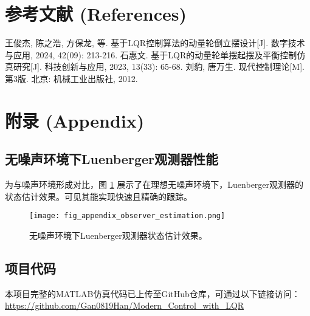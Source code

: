 \documentclass[12pt, a4paper]{article}
\begin{document}
\section{参考文献 (References)}
\begin{thebibliography}{9}
     王俊杰, 陈之浩, 方保龙, 等. 基于LQR控制算法的动量轮倒立摆设计[J]. 数字技术与应用, 2024, 42(09): 213-216.
     石惠文. 基于LQR的动量轮单摆起摆及平衡控制仿真研究[J]. 科技创新与应用, 2023, 13(33): 65-68.
     刘豹, 唐万生. 现代控制理论[M]. 第3版. 北京: 机械工业出版社, 2012.
\end{thebibliography}

\appendix
\section{附录 (Appendix)}
\subsection{无噪声环境下Luenberger观测器性能}
为与噪声环境形成对比，图 \ref{fig:appendix_observer} 展示了在理想无噪声环境下，Luenberger观测器的状态估计效果。可见其能实现快速且精确的跟踪。
\begin{figure}[htbp]
    \centering
    \texttt{[image: fig\_appendix\_observer\_estimation.png]}
    \caption{无噪声环境下Luenberger观测器状态估计效果。}
    \label{fig:appendix_observer}
\end{figure}
\subsection{项目代码}
本项目完整的MATLAB仿真代码已上传至GitHub仓库，可通过以下链接访问：
\url{https://github.com/Gan0819Han/Modern_Control_with_LQR}
\end{document}
